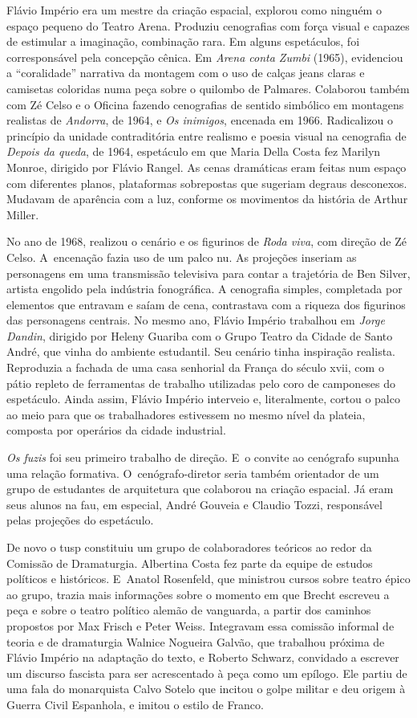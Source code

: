 {Flávio Império era um mestre da criação espacial, explorou como ninguém
o espaço pequeno do Teatro Arena. Produziu cenografias com força visual
e capazes de estimular a imaginação, combinação rara. Em alguns
espetáculos, foi corresponsável pela concepção cênica. Em {\it Arena
conta Zumbi} (1965), evidenciou a “coralidade” narrativa da montagem com
o uso de calças jeans claras e camisetas coloridas numa peça sobre
o quilombo de Palmares. Colaborou também com Zé Celso e o Oficina
fazendo cenografias de sentido simbólico em montagens realistas de
{\it Andorra}, de 1964, e {\it Os inimigos}, encenada em 1966.
Radicalizou o princípio da unidade contraditória entre realismo e poesia
visual na cenografia de {\it Depois da queda}, de 1964, espetáculo em
que Maria Della Costa fez Marilyn Monroe, dirigido por Flávio Rangel. As
cenas dramáticas eram feitas num espaço com diferentes planos,
plataformas sobrepostas que sugeriam degraus desconexos. Mudavam de
aparência com a luz, conforme os movimentos da história de Arthur
Miller.

No ano de 1968, realizou o cenário e os figurinos de {\it Roda viva}, com
direção de Zé Celso. A~encenação fazia uso de um palco nu. As projeções
inseriam as personagens em uma transmissão televisiva para contar a
trajetória de Ben Silver, artista engolido pela indústria fonográfica. A
cenografia simples, completada por elementos que entravam e saíam de
cena, contrastava com a riqueza dos figurinos das personagens centrais.
No mesmo ano, Flávio Império trabalhou em {\it Jorge Dandin}, dirigido
por Heleny Guariba com o Grupo Teatro da Cidade de Santo André,
que vinha do ambiente estudantil. Seu cenário tinha inspiração realista.
Reproduzia a fachada de uma casa senhorial da França do século {\sc xvii}, com
o pátio repleto de ferramentas de trabalho utilizadas pelo coro de
camponeses do espetáculo. Ainda assim, Flávio Império interveio e, literalmente,
cortou o palco ao meio para que os trabalhadores
estivessem no mesmo nível da plateia, composta por operários da cidade
industrial.

{\it Os fuzis} foi seu primeiro trabalho de direção. E~o convite ao
cenógrafo supunha uma relação formativa. O~cenógrafo-diretor seria
também orientador de um grupo de estudantes de arquitetura que colaborou
na criação espacial. Já eram seus alunos na {\sc fau}, em especial, André
Gouveia e Claudio Tozzi, responsável pelas projeções do espetáculo.

De novo o {\sc tusp} constituiu um grupo de colaboradores teóricos ao redor da
Comissão de Dramaturgia. Albertina Costa fez parte da equipe de estudos
políticos e históricos. E~Anatol Rosenfeld, que ministrou cursos sobre teatro
épico ao grupo, trazia mais informações sobre o momento em que Brecht
escreveu a peça e sobre o teatro político alemão de vanguarda, a partir
dos caminhos propostos por Max Frisch e Peter Weiss. Integravam essa
comissão informal de teoria e de dramaturgia Walnice Nogueira Galvão,
que trabalhou próxima de Flávio Império na adaptação do texto, e Roberto
Schwarz, convidado a escrever um discurso fascista para ser acrescentado
à peça como um epílogo. Ele partiu de uma fala do monarquista Calvo Sotelo
que incitou o golpe militar e deu origem à Guerra Civil Espanhola, e
imitou o estilo de Franco.

}

